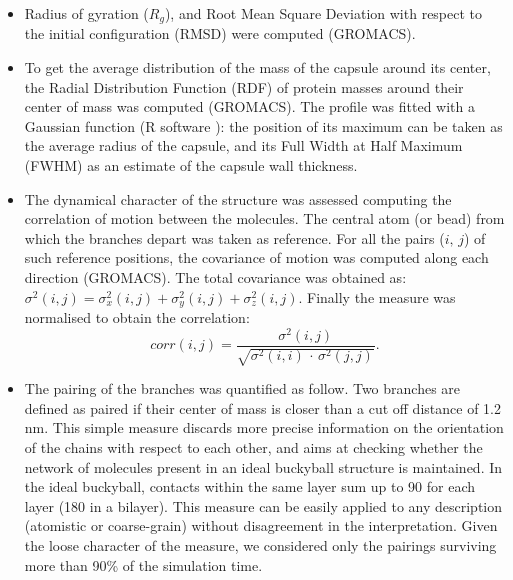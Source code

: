 \begin{itemize}
\item Radius of gyration ($R_g$), and Root Mean Square Deviation with respect to the initial configuration (RMSD) were computed (GROMACS).

\item To get the average distribution of the mass of the capsule around its center, the Radial Distribution Function (RDF) of protein masses around their center of mass was computed (GROMACS). The profile was fitted with a Gaussian function (R software \citep{R}): the position of its maximum can be taken as the average radius of the capsule, and its Full Width at Half Maximum (FWHM) as an estimate of the capsule wall thickness.

\item The dynamical character of the structure was assessed computing the correlation of motion between the molecules. The central atom (or bead) from which the branches depart was taken as reference. For all the pairs ($i, \, j$) of such reference positions, the covariance of motion was computed along each direction (GROMACS). The total covariance was obtained as: $\sigma^2(i,j) = \sigma_x^2(i,j) + \sigma_y^2(i,j) + \sigma_z^2(i,j)$. Finally the measure was normalised to obtain the correlation:
\begin{equation}
corr(i,j) = \frac{\sigma^2(i,j)}{\sqrt{\sigma^2(i,i)\,\cdot\,\sigma^2(j,j)}}.
\end{equation}

\item The pairing of the branches was quantified as follow. Two branches are defined as paired if their center of mass is closer than a cut off distance of 1.2 nm. This simple measure discards more precise information on the orientation of the chains with respect to each other, and aims at checking whether the network of molecules present in an ideal buckyball structure is maintained. In the ideal buckyball, contacts within the same layer sum up to 90 for each layer (180 in a bilayer). This measure can be easily applied to any description (atomistic or coarse-grain) without disagreement in the interpretation. Given the loose character of the measure, we considered only the pairings surviving more than 90\% of the simulation time.


\end{itemize}
